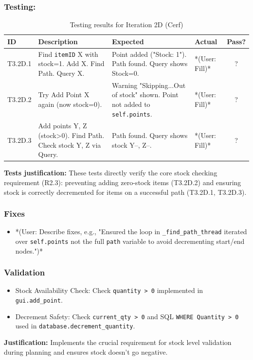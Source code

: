 \subsubsection{Testing:}
\begin{table}[htbp]
	\centering
	\begin{tabularx}{\textwidth}{|l|X|p{4.5cm}|p{1.5cm}|c|}
		\hline
		\textbf{ID} & \textbf{Description} & \textbf{Expected} & \textbf{Actual} & \textbf{Pass?} \\
		\hline
		T3.2D.1 & Find \verb|itemID| X with stock=1. Add X. Find Path. Query X. & Point added ("Stock: 1"). Path found. Query shows Stock=0. & *(User: Fill)* & ? \\
		\hline
		T3.2D.2 & Try Add Point X again (now stock=0). & Warning "Skipping...Out of stock" shown. Point not added to \verb|self.points|. & *(User: Fill)* & ? \\
		\hline
		T3.2D.3 & Add points Y, Z (stock>0). Find Path. Check stock Y, Z via Query. & Path found. Query shows stock Y--, Z--. & *(User: Fill)* & ? \\
		\hline
	\end{tabularx}
	\caption{Testing results for Iteration 2D (Cerf)}
\end{table}
\textbf{Tests justification:} These tests directly verify the core stock checking requirement (R2.3): preventing adding zero-stock items (T3.2D.2) and ensuring stock is correctly decremented for items on a successful path (T3.2D.1, T3.2D.3).

\subsubsection{Fixes}
\begin{itemize}
	\item *(User: Describe fixes, e.g., "Ensured the loop in \verb|_find_path_thread| iterated over \verb|self.points| not the full \verb|path| variable to avoid decrementing start/end nodes.")*
\end{itemize}

\subsubsection{Validation}
\begin{itemize}
	\item Stock Availability Check: Check \verb|quantity > 0| implemented in \verb|gui.add_point|.
	\item Decrement Safety: Check \verb|current_qty > 0| and SQL \verb|WHERE Quantity > 0| used in \verb|database.decrement_quantity|.
\end{itemize}
\textbf{Justification:} Implements the crucial requirement for stock level validation during planning and ensures stock doesn't go negative.

